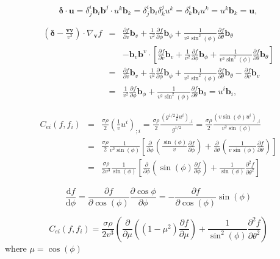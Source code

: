 \documentclass[review]{elsarticle}
\newcommand{\pdv}[2]{\frac{\partial{#1}}{\partial{#2}}}
\newcommand{\vect}[1]{\boldsymbol{#1}}
\newcommand{\matr}[1]{\mathbf{#1}}
\newcommand{\dI}{\text{d}}
\newcommand{\odv}[2]{\frac{\dI #1}{\dI #2}}
\newcommand{\vmag}{v}
\begin{document}
\begin{equation}
  \matr{\delta}\cdot\vect{u} = 
  \delta^i_j\vect{b}_i\vect{b}^j\cdot u^k\vect{b}_k =  
  \delta^i_j\vect{b}_i \delta^j_k u^k = \delta^i_k\vect{b}_i u^k 
  = u^k \vect{b}_k = \vect{u} ,
  \nonumber
\end{equation}

\begin{eqnarray}
  \left(\matr{\delta} - \frac{\vect{v}\vect{v}}{\vmag^2} \right)
  \cdot\nabla_{\vect{v}} f &=& 
  \pdv{f}{\vmag}\vect{b}_\vmag + \frac{1}{\vmag^2}\pdv{f}{\phi}\vect{b}_\phi
  + \frac{1}{\vmag^2\sin^2(\phi)}\pdv{f}{\theta}\vect{b}_{\theta} \nonumber \\ 
  &&- \vect{b}_\vmag\vect{b}^\vmag\cdot\left[\pdv{f}{\vmag}\vect{b}_\vmag 
  + \frac{1}{\vmag^2}\pdv{f}{\phi}\vect{b}_\phi
  + \frac{1}{\vmag^2\sin^2(\phi)}\pdv{f}{\theta}\vect{b}_{\theta} \right]
  \nonumber \\
  &=& \pdv{f}{\vmag}\vect{b}_\vmag 
  + \frac{1}{\vmag^2}\pdv{f}{\phi}\vect{b}_\phi
  + \frac{1}{\vmag^2\sin^2(\phi)}\pdv{f}{\theta}\vect{b}_{\theta}  
  - \pdv{f}{\vmag}\vect{b}_\vmag \nonumber \\
  &=& \frac{1}{\vmag^2}\pdv{f}{\phi}\vect{b}_\phi
  + \frac{1}{\vmag^2\sin^2(\phi)}\pdv{f}{\theta}\vect{b}_{\theta} 
  = u^i\vect{b}_i ,
\end{eqnarray}

\begin{eqnarray}
  C_{ei}(f, f_i) &=& \frac{\sigma\rho}{2}\left(\frac{1}{\vmag}u^i\right)_{;i} 
  = \frac{\sigma\rho}{2} \frac{(g^{1/2} \frac{1}{\vmag}u^i)_{,i}}{g^{1/2}}
  = \frac{\sigma\rho}{2} \frac{(\vmag\sin(\phi)u^i)_{,i}}{\vmag^2\sin(\phi)}
  \nonumber\\
  &=& \frac{\sigma\rho}{2} \frac{1}{\vmag^2\sin(\phi)}
  \left[\pdv{}{\phi}\left(\frac{\sin(\phi)}{\vmag}\pdv{f}{\phi}\right)
  + \pdv{}{\theta}\left(\frac{1}{\vmag\sin(\phi)}\pdv{f}{\theta}\right) \right]
  \nonumber\\
  &=& \frac{\sigma\rho}{2\vmag^3} \frac{1}{\sin(\phi)}
  \left[\pdv{}{\phi}\left(\sin(\phi)\pdv{f}{\phi}\right)
  + \frac{1}{\sin(\phi)}\frac{\partial^2f}{\partial\theta^2} \right]
\end{eqnarray}

\begin{equation}
  \odv{f}{\phi} = \pdv{f}{\cos(\phi)}\pdv{\cos{\phi}}{\phi} 
  = - \pdv{f}{\cos(\phi)}\sin(\phi)
\end{equation}

\begin{equation}
  C_{ei}(f, f_i) = \frac{\sigma\rho}{2\vmag^3} 
  \left(\pdv{}{\mu}\left((1 - \mu^2)\pdv{f}{\mu}\right)
  + \frac{1}{\sin^2(\phi)}\frac{\partial^2f}{\partial\theta^2} \right)
\end{equation}
where $\mu = \cos(\phi)$
\end{document}
